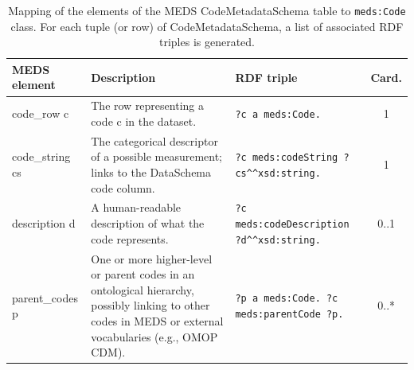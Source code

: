 \begin{table}[htbp]
	\centering
	\caption{Mapping of the elements of the MEDS CodeMetadataSchema table to \texttt{meds:Code} class. For each tuple (or row) of CodeMetadataSchema, a list of associated RDF triples is generated. } 
	\label{tab:paper3_codes}
\begin{tabularx}{\textwidth}{l >{\raggedright\arraybackslash}X >{\raggedright\arraybackslash}X c}		\toprule
		\textbf{MEDS element} & \textbf{Description} & \textbf{RDF triple} & \textbf{Card.} \\
		\midrule
		code\_row c & The row representing a code c in the dataset. & \texttt{?c a meds:Code.} & 1 \\
		code\_string cs & The categorical descriptor of a possible measurement; links to the DataSchema code column. & \texttt{?c meds:codeString ?cs}\texttt{\string^\string^}\texttt{xsd:string.} & 1 \\
		description d& A human-readable description of what the code represents. & \texttt{?c meds:codeDescription ?d}\texttt{\string^\string^}\texttt{xsd:string.} & 0..1 \\
		parent\_codes p & One or more higher-level or parent codes in an ontological hierarchy, possibly linking to other codes in MEDS or external vocabularies (e.g., OMOP CDM). & \texttt{?p a meds:Code. \break ?c meds:parentCode ?p.} & 0..* \\
		\bottomrule
\end{tabularx}
\end{table}
%
